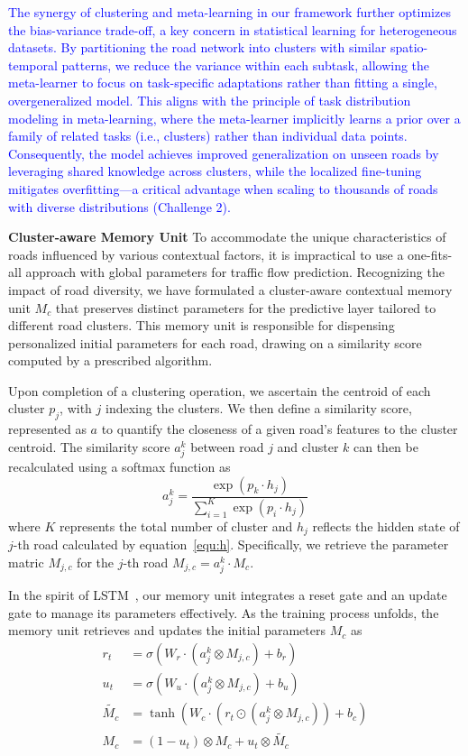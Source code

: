 \documentclass[lettersize,journal]{IEEEtran}
\begin{document}
\textcolor{blue}{The synergy of clustering and meta-learning in our framework further optimizes the bias-variance trade-off, a key concern in statistical learning for heterogeneous datasets. By partitioning the road network into clusters with similar spatio-temporal patterns, we reduce the variance within each subtask, allowing the meta-learner to focus on task-specific adaptations rather than fitting a single, overgeneralized model. This aligns with the principle of task distribution modeling in meta-learning, where the meta-learner implicitly learns a prior over a family of related tasks (i.e., clusters) rather than individual data points. Consequently, the model achieves improved generalization on unseen roads by leveraging shared knowledge across clusters, while the localized fine-tuning mitigates overfitting—a critical advantage when scaling to thousands of roads with diverse distributions (Challenge 2).}

\color{blue}

\textbf{Cluster-aware Memory Unit}
To accommodate the unique characteristics of roads influenced by various contextual factors, it is impractical to use a one-fits-all approach with global parameters for traffic flow prediction. Recognizing the impact of road diversity, we have formulated a cluster-aware contextual memory unit $M_c$ that preserves distinct parameters for the predictive layer tailored to different road clusters. This memory unit is responsible for dispensing personalized initial parameters for each road, drawing on a similarity score computed by a prescribed algorithm.

Upon completion of a clustering operation, we ascertain the centroid of each cluster $p_j$, with $j$ indexing the clusters. We then define a similarity score, represented as $a$ to quantify the closeness of a given road's features to the cluster centroid. The similarity score $a_j^k$ between road $j$ and cluster $k$ can then be recalculated using a softmax function as 
\begin{equation}
     a_j^k = \frac{\exp(p_k \cdot h_j)}{\sum_{i=1}^{K} \exp(p_i \cdot h_j)}
\end{equation} 
where $K$ represents the total number of cluster and $h_j$ reflects the hidden state of $j$-th road calculated by equation~\ref{equ:h}. Specifically, we retrieve the parameter matric $M_{j,c}$ for the $j$-th road $ M_{j,c} = a_j^k \cdot M_c $.

In the spirit of LSTM~\cite{lstm}, our memory unit integrates a reset gate and an update gate to manage its parameters effectively. As the training process unfolds, the memory unit retrieves and updates the initial parameters $M_c$ as
\begin{align}
r_t & = \sigma(W_r \cdot (a_j^k \otimes M_{j,c}) + b_r) \\
u_t & = \sigma(W_u \cdot  (a_j^k \otimes M_{j,c}) + b_u) \\
\tilde{M_c} & = \tanh(W_c \cdot (r_t \odot (a_j^k \otimes M_{j,c})) + b_c) \\
M_c & = (1 - u_t) \otimes M_c + u_t \otimes \tilde{M_c}
\end{align}
\end{document}
